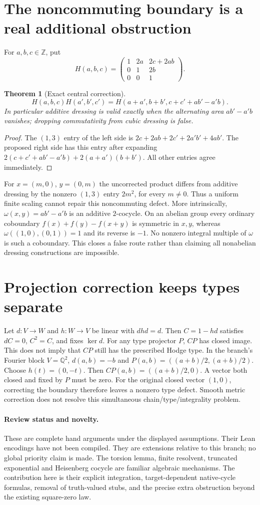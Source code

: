 \documentclass[11pt]{article}
\newtheorem{theorem}{Theorem}
\newcommand{\Q}{\mathbb Q}
\newcommand{\Z}{\mathbb Z}
\begin{document}
\section{The noncommuting boundary is a real additional obstruction}
For $a,b,c\in\Z$, put
\[
 H(a,b,c)=
 \begin{pmatrix}1&2a&2c+2ab\\0&1&2b\\0&0&1\end{pmatrix}.
\]
\begin{theorem}[Exact central correction]
\[
 H(a,b,c)H(a',b',c')=
 H(a+a',b+b',c+c'+ab'-a'b).
\]
In particular additive dressing is valid exactly when the alternating
area $ab'-a'b$ vanishes; dropping commutativity from cubic dressing is false.
\end{theorem}
\begin{proof}
The $(1,3)$ entry of the left side is
$2c+2ab+2c'+2a'b'+4ab'$.
The proposed right side has this entry after expanding
$2(c+c'+ab'-a'b)+2(a+a')(b+b')$. All other entries agree immediately.
\end{proof}
For $x=(m,0)$, $y=(0,m)$ the uncorrected product differs from additive
dressing by the nonzero $(1,3)$ entry $2m^2$, for every $m\ne0$.
Thus a uniform finite scaling cannot repair this noncommuting defect.
More intrinsically, $\omega(x,y)=ab'-a'b$ is an additive $2$-cocycle.
On an abelian group every ordinary coboundary
$f(x)+f(y)-f(x+y)$ is symmetric in $x,y$, whereas
$\omega((1,0),(0,1))=1$ and its reverse is $-1$.
No nonzero integral multiple of $\omega$ is such a coboundary.
This closes a false route rather than claiming all nonabelian dressing
constructions are impossible.

\section{Projection correction keeps types separate}
Let $d:V\to W$ and $h:W\to V$ be linear with $dhd=d$.
Then $C=1-hd$ satisfies $dC=0$, $C^2=C$, and fixes $\ker d$.
For any type projector $P$, $CP$ has closed image. This does not imply
that $CP$ still has the prescribed Hodge type.
In the branch's Fourier block $V=\Q^2$, $d(a,b)=-b$ and
$P(a,b)=((a+b)/2,(a+b)/2)$. Choose $h(t)=(0,-t)$.
Then $CP(a,b)=((a+b)/2,0)$. A vector both closed and fixed by $P$
must be zero. For the original closed vector $(1,0)$, correcting the
boundary therefore leaves a nonzero type defect. Smooth metric correction
does not resolve this simultaneous chain/type/integrality problem.

\paragraph{Review status and novelty.}
These are complete hand arguments under the displayed assumptions.
Their Lean encodings have not been compiled. They are extensions relative
to this branch; no global priority claim is made. The torsion lemma,
finite resolvent, truncated exponential and Heisenberg cocycle are familiar
algebraic mechanisms. The contribution here is their explicit integration,
target-dependent native-cycle formulas, removal of truth-valued stubs,
and the precise extra obstruction beyond the existing square-zero law.
\end{document}
